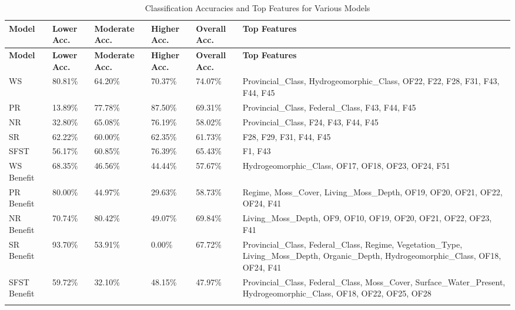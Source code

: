 \begin{longtable}{|p{2cm}|p{2cm}|p{2cm}|p{2cm}|p{2cm}|p{4cm}|}
\hline
\textbf{Model} & \textbf{Lower Acc.} & \textbf{Moderate Acc.} & \textbf{Higher Acc.} & \textbf{Overall Acc.} & \textbf{Top Features} \\ \hline
\endfirsthead
\hline
\textbf{Model} & \textbf{Lower Acc.} & \textbf{Moderate Acc.} & \textbf{Higher Acc.} & \textbf{Overall Acc.} & \textbf{Top Features} \\ \hline
\endhead

WS & 80.81\% & 64.20\% & 70.37\% & 74.07\% & Provincial\_Class, Hydrogeomorphic\_Class, OF22, F22, F28, F31, F43, F44, F45 \\ \hline
PR & 13.89\% & 77.78\% & 87.50\% & 69.31\% & Provincial\_Class, Federal\_Class, F43, F44, F45 \\ \hline
NR & 32.80\% & 65.08\% & 76.19\% & 58.02\% & Provincial\_Class, F24, F43, F44, F45 \\ \hline
SR & 62.22\% & 60.00\% & 62.35\% & 61.73\% & F28, F29, F31, F44, F45 \\ \hline
SFST & 56.17\% & 60.85\% & 76.39\% & 65.43\% & F1, F43 \\ \hline
WS Benefit & 68.35\% & 46.56\% & 44.44\% & 57.67\% & Hydrogeomorphic\_Class, OF17, OF18, OF23, OF24, F51 \\ \hline
PR Benefit & 80.00\% & 44.97\% & 29.63\% & 58.73\% & Regime, Moss\_Cover, Living\_Moss\_Depth, OF19, OF20, OF21, OF22, OF24, F41 \\ \hline
NR Benefit & 70.74\% & 80.42\% & 49.07\% & 69.84\% & Living\_Moss\_Depth, OF9, OF10, OF19, OF20, OF21, OF22, OF23, F41 \\ \hline
SR Benefit & 93.70\% & 53.91\% & 0.00\% & 67.72\% & Provincial\_Class, Federal\_Class, Regime, Vegetation\_Type, Living\_Moss\_Depth, Organic\_Depth, Hydrogeomorphic\_Class, OF18, OF24, F41 \\ \hline
SFST Benefit & 59.72\% & 32.10\% & 48.15\% & 47.97\% & Provincial\_Class, Federal\_Class, Moss\_Cover, Surface\_Water\_Present, Hydrogeomorphic\_Class, OF18, OF22, OF25, OF28 \\ \hline
\caption{Classification Accuracies and Top Features for Various Models}
\label{tab:grouping_1d}
\end{longtable}

